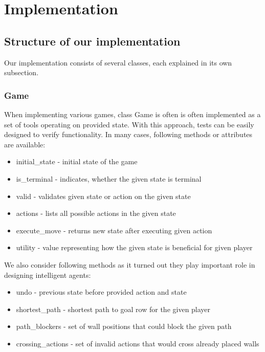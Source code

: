\chapter{Implementation}\label{chap:4}

\section{Structure of our implementation}
Our implementation consists of several classes, each explained in its own
subsection.

\subsection{Game}
When implementing various games, class Game is often is often implemented
as a set of tools operating on provided state.
With this approach, tests can be easily designed to verify functionality.
In many cases, following methods or attributes are available:
\begin{itemize}
  \vspace*{-0.25cm}
  \setlength\itemsep{-0.15cm}

  \item initial\_state - initial state of the game
  \item is\_terminal - indicates, whether the given state is terminal
  \item valid - validates given state or action on the given state
  \item actions - lists all possible actions in the given state
  \item execute\_move - returns new state after executing given action
  \item utility - value representing how the given state is beneficial
                  for given player

  \vspace*{-0.25cm}
\end{itemize}

\noindent We also consider following methods as it turned out they play
important role in designing intelligent agents:
\begin{itemize}
  \vspace*{-0.25cm}
  \setlength\itemsep{-0.15cm}

  \item undo - previous state before provided action and state
  \item shortest\_path - shortest path to goal row for the given player
  \item path\_blockers - set of wall positions that could block the given path
  \item crossing\_actions - set of invalid actions that would cross already
                            placed walls

  \vspace*{-0.25cm}
\end{itemize}


